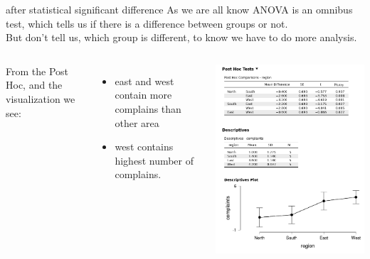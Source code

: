 \documentclass[8pt]{beamer}
\begin{document}
        \begin{frame}{after statistical significant difference}
            As we are all know ANOVA is an omnibus test, which tells us if there is a difference between groups or not.\\
            But don't tell us, which group is different, to know we have to do more analysis.\\
            \begin{columns}
                From the Post Hoc, and the visualization we see:
                \begin{itemize}
                    \item east and west contain more complains than other area
                    \item west contains highest number of complains.
                \end{itemize}
                \centering
                \includegraphics[width=.95\textwidth]{images/after ANOVA.png}
            \end{columns}
        \end{frame}
    
\end{document}
